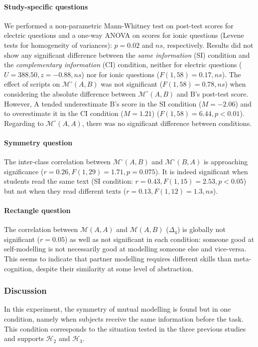 \documentclass[natbib]{svjour3}
\newcommand{\A}{A\xspace}
\newcommand{\B}{B\xspace}
\newcommand{\gmodel}[2]{{$\mathcal{M}(#1, #2)$}}
\newcommand{\gModel}[2]{{$\mathcal{M}^{\circ}(#1, #2)$}}
\begin{document}
\paragraph{Study-specific questions} We performed a non-parametric Mann-Whitney
test on post-test scores for electric questions and a one-way ANOVA on scores
for ionic questions (Levene tests for homogeneity of variances): $p = 0.02$ and
$ns$, respectively. Results  did not show any significant difference between the
\emph{same information} (SI) condition and the \emph{complementary information}
(CI) condition, neither for electric questions ($U = 388.50, z = -0.88, ns$) nor
for ionic questions ($F(1, 58) = 0.17, ns$).  The effect of scripts on
\gModel{A}{B} was not significant ($F(1, 58) = 0.78, ns$) when considering the
absolute difference between \gModel{A}{B} and \B's post-test score. However, \A
tended underestimate \B's score in the SI condition ($M = -2.06$) and to
overestimate it in the CI condition ($M = 1.21$) ($F(1, 58) = 6.44, p<0.01$).
Regarding to \gModel{A}{A}, there was no significant difference between
conditions.

\paragraph{Symmetry question} The inter-class correlation between \gModel{A}{B}
and \gModel{B}{A} is approaching significance ($r= 0.26, F(1,29)=1.71, p=
0.075$). It is indeed significant when students read the same text (SI
condition: $r=0.43, F(1,15)=2.53, p<0.05$) but not when they read different texts
($r= 0.13, F(1,12)=1.3, ns$). 

\paragraph{Rectangle question} The correlation between \gmodel{A}{A} and
\gmodel{A}{B} ($\Delta_4$) is globally not significant ($r=0.05$) as well as not
significant in each condition: someone good at self-modelling is not necessarily
good at modelling someone else and vice-versa.  This seems to indicate that
partner modelling requires different skills than meta-cognition, despite their
similarity at some level of abstraction.

\subsubsection*{Discussion}

In this experiment, the symmetry of mutual modelling is  found but  in one
condition, namely when subjects receive the same information before the task.
This condition corresponds to the situation tested in the three previous studies
and supports  $\mathcal{H}_{2}$ and  $\mathcal{H}_{3}$. 
\end{document}
